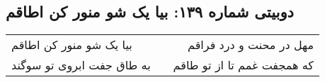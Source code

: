 \begin{center}
\section*{دوبیتی شماره ۱۳۹: بیا یک شو منور کن اطاقم}
\label{sec:139}
\begin{longtable}{l p{0.5cm} r}
بیا یک شو منور کن اطاقم
&&
مهل در محنت و درد فراقم
\\
به طاق جفت ابروی تو سوگند
&&
که همجفت غمم تا از تو طاقم
\\
\end{longtable}
\end{center}
